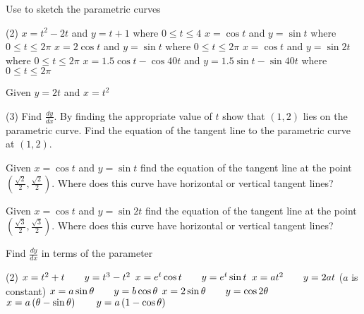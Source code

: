 \begin{Exercise}[title={Rate of Change},label=exRateOfChange]
\begin{Exercise}[title={Parametric Differentiation},label=exParametric]
	\Question Use \desmos to sketch the parametric curves
	\begin{tasks}(2)
		\task $x =t^{2} -2 t$ and $y =t +1$ where $0 \leqslant t \leqslant 4$ %
		\task $x =\cos  t$ and $y =\sin  t$ where $0 \leqslant t \leqslant 2 \pi $ %
		\task $x =2 \cos  t$ and $y =\sin  t$ where $0 \leqslant t \leqslant 2 \pi $%
		\task $x =\cos  t$ and $y =\sin  2 t$ where $0 \leqslant t \leqslant 2 \pi $ %
		\task $x =1.5 \cos  t -\cos  40 t$ and $y =1.5 \sin  t -\sin  40 t$ where $0 \leqslant t \leqslant 2 \pi $%
	\end{tasks}
	
	\Question Given $y =2 t$ and $x =t^{2}$ 
	\begin{tasks}(3)
		\task Find $\frac{d y}{d x}$.%
		\task By finding the appropriate value of $t$ show that $(1 ,2)$ lies on the parametric curve. %
		\task Find the equation of the tangent line to the parametric curve at $(1 ,2)$. %
	\end{tasks}

	\Question Given
	$x =\cos  t$ and $y =\sin  t$ find the equation of the tangent line at the point $\left (\frac{\sqrt{2}}{2} ,\frac{\sqrt{2}}{2}\right )$. Where does this curve	have horizontal or vertical tangent lines? %
	
	\Question Given $x =\cos  t$ and $y =\sin  2 t$ find the equation of the tangent line at the point $\left (\frac{\sqrt{3}}{2} ,\frac{\sqrt{3}}{2}\right )$. Where does this curve have horizontal or vertical tangent lines? %
	
		\Question Find $\frac{d y}{d x}$ in terms of the parameter 
	\begin{tasks}(2)
		\task  $x =t^{2} +t\text{\quad \quad }y =t^{3} -t^{2}$ %
		\task $x =e^{t} \cos  t\text{\quad \quad }y =e^{t} \sin  t$ %
		\task $x =a t^{2}\text{\quad \quad }y =2 a t$ ($a$ is constant) %
		\task $x =a \sin  \theta \text{\quad \quad }y =b \cos  \theta $ %
		\task $x =2 \sin  \theta \text{\quad \quad }y =\cos  2 \theta $ %
		\task $x =a \left (\theta  -\sin  \theta \right )\text{\quad \quad }y =a \left (1 -\cos  \theta \right )$%
	\end{tasks}
	

\end{Exercise}
\end{Exercise}

